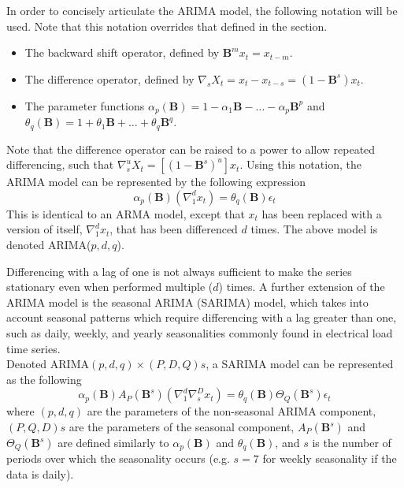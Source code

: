 In order to concisely articulate the ARIMA model, the following notation will be used.
Note that this notation overrides that defined in the  section.
\begin{itemize}
	\item The backward shift operator, defined by $\textbf{B}^{m}x_{t} = x_{t-m}$. 
	\item The difference operator, defined by $\nabla_{s} X_{t} = x_{t} - x_{t-s} = (1 - \textbf{B}^{s})x_{t}$. 
	\item The parameter functions $\alpha_{p}(\textbf{B}) = 1 - \alpha_{1}\textbf{B} - \ldots - \alpha_{p}\textbf{B}^p$ and $\theta_{q}(\textbf{B}) = 1 + \theta_{1}\textbf{B} + \ldots + \theta_{q}\textbf{B}^q$.
\end{itemize}
Note that the difference operator can be raised to a power to allow repeated differencing, such that $\nabla_{s}^{u} X_{t} = [(1 - \textbf{B}^{s})^{u}]x_{t}$.
Using this notation, the ARIMA model can be represented by the following expression
\begin{equation}
\alpha_{p}(\textbf{B})(\nabla_{1}^{d}x_{t}) = \theta_{q}(\textbf{B})\epsilon_{t}
\end{equation}
This is identical to an ARMA model, except that $x_{t}$ has been replaced with a  version of itself, $\nabla_{1}^{d}x_{t}$, that has been differenced $d$ times.
The above model is denoted ARIMA($p,d,q$).

Differencing with a lag of one is not always sufficient to make the series stationary even when performed multiple ($d$) times.
A further extension of the ARIMA model is the seasonal ARIMA (SARIMA) model, which takes into account seasonal patterns which require differencing with a lag greater than one, such as daily, weekly, and yearly seasonalities commonly found in electrical load time series.
\\
Denoted ARIMA$(p,d,q)\times(P,D,Q)s$, a SARIMA model can be represented as the following
\begin{equation}
\alpha_{p}(\textbf{B})A_{P}(\textbf{B}^{s})(\nabla_{1}^{d}\nabla_{s}^{D}x_{t}) = \theta_{q}(\textbf{B})\Theta_{Q}(\textbf{B}^{s})\epsilon_{t}
\end{equation}
where $(p,d,q)$ are the parameters of the non-seasonal ARIMA component, $(P,Q,D)s$ are the parameters of the seasonal component, $A_{P}(\textbf{B}^{s})$ and $\Theta_{Q}(\textbf{B}^{s})$ are defined similarly to $\alpha_{p}(\textbf{B})$ and $\theta_{q}(\textbf{B})$, and $s$ is the number of periods over which the seasonality occurs (e.g. $s=7$ for weekly seasonality if the data is daily).

